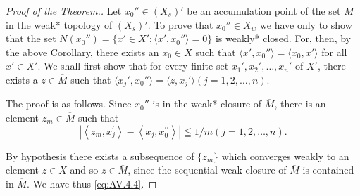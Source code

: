 \begin{proof}[Proof of the Theorem.]
Let $x_0'' \in (X_s)'$ be an accumulation point of the set $\overline{M}$ in the weak* topology of $(X_s)'$. To prove that $x_0'' \in X_w$ we have only to show that the set $N(x_0'') = \{x' \in X'; \langle x', x_0'' \rangle = 0\}$ is weakly* closed. For, then, by the above Corollary, there exists an $x_0 \in X$ such that $\langle x', x_0'' \rangle = \langle x_0, x' \rangle$ for all $x' \in X'$. We shall first show that 
for every finite set $x_1', x_2', \ldots, x_n'$ of $X'$, there exists a $z \in \overline{M}$ such that $\langle x_j', x_0'' \rangle = \langle z, x_j' \rangle (j = 1, 2, \ldots, n)$. 

The proof is as follows. Since $x_0''$ is in the weak* closure of $\overline{M}$, there is an element $z_m \in \overline{M}$ such that 
\begin{equation}\label{eq:AV.4.4}
\left| \left\langle z _{m}, x _{j} ^{\prime} \right\rangle - \left\langle x _{j}, x _{0} ^{\prime \prime} \right\rangle \right| \leqq 1 / m (j = 1, 2, \dots , n).
\end{equation}

By hypothesis there exists a subsequence of $\{z_m\}$ which converges weakly to an element $z \in X$ and so $z \in \overline{M}$, since the sequential weak closure of $\overline{M}$ is contained in $\overline{M}$. We have thus \eqref{eq:AV.4.4}. 


\end{proof}
